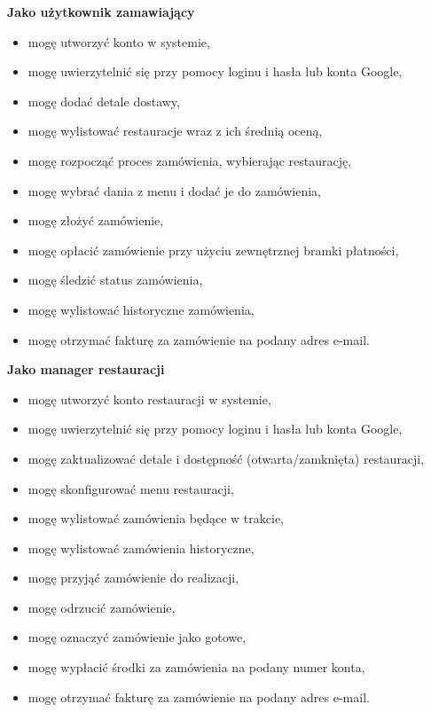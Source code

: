 \medskip

\textbf{Jako użytkownik zamawiający}
\begin{itemize}
    \item mogę utworzyć konto w systemie,
    \item mogę uwierzytelnić się przy pomocy loginu i hasła lub konta Google,
    \item mogę dodać detale dostawy,
    \item mogę wylistować restauracje wraz z ich średnią oceną,
    \item mogę rozpocząć proces zamówienia, wybierając restaurację,
    \item mogę wybrać dania z menu i dodać je do zamówienia,
    \item mogę złożyć zamówienie,
    \item mogę opłacić zamówienie przy użyciu zewnętrznej bramki płatności,
    \item mogę śledzić status zamówienia,
    \item mogę wylistować historyczne zamówienia,
    \item mogę otrzymać fakturę za zamówienie na podany adres e-mail.
\end{itemize}

\medskip

\textbf{Jako manager restauracji}
\begin{itemize}
    \item mogę utworzyć konto restauracji w systemie,
    \item mogę uwierzytelnić się przy pomocy loginu i hasła lub konta Google,
    \item mogę zaktualizować detale i dostępność (otwarta/zamknięta) restauracji,
    \item mogę skonfigurować menu restauracji,
    \item mogę wylistować zamówienia będące w trakcie,
    \item mogę wylistować zamówienia historyczne,
    \item mogę przyjąć zamówienie do realizacji,
    \item mogę odrzucić zamówienie,
    \item mogę oznaczyć zamówienie jako gotowe,
    \item mogę wypłacić środki za zamówienia na podany numer konta,
    \item mogę otrzymać fakturę za zamówienie na podany adres e-mail.
\end{itemize}

